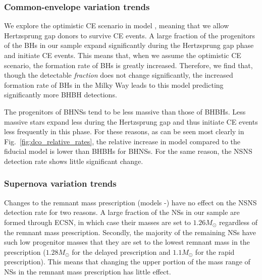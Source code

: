 \subsubsection{Common-envelope variation trends}\label{sec:detection_rate_CE_trends}


We explore the optimistic CE scenario in model \modOpt{}, meaning that we allow Hertzsprung gap donors to survive CE events. A large fraction of the progenitors of the BHs in our sample expand significantly during the Hertzsprung gap phase and initiate CE events. This means that, when we assume the optimistic CE scenario, the formation rate of BHs is greatly increased. Therefore, we find that, though the detectable \textit{fraction} does not change significantly, the increased formation rate of BHs in the Milky Way leads to this model predicting significantly more BHBH detections.

The progenitors of BHNSs tend to be less massive than those of BHBHs. Less massive stars expand less during the Hertzsprung gap and thus initiate CE events less frequently in this phase. For these reasons, as can be seen most clearly in Fig.~\ref{fig:dco_relative_rates}, the relative increase in model \modOpt{} compared to the fiducial model is lower than BHBHs for BHNSs. For the same reason, the NSNS detection rate shows little significant change.

\subsubsection{Supernova variation trends}

Changes to the remnant mass prescription (models \modRapid{}-\modNSHigh{}) have no effect on the NSNS detection rate for two reasons. A large fraction of the NSs in our sample are formed through ECSN, in which case their masses are set to $1.26 \unit{M_\odot}$ regardless of the remnant mass prescription. Secondly, the majority of the remaining NSs have such low progenitor masses that they are set to the lowest remnant mass in the prescription ($1.28 \unit{M_\odot}$ for the delayed prescription and $1.1 \unit{M_\odot}$ for the rapid prescription). This means that changing the upper portion of the mass range of NSs in the remnant mass prescription has little effect.

